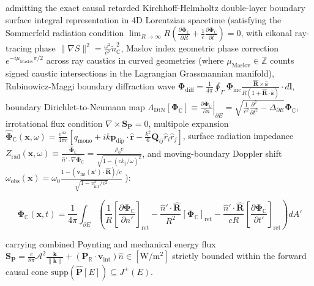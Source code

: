 \documentclass[11pt,a4paper]{article}
\theoremstyle{definition}
\theoremstyle{remark}
\begin{document}
admitting the exact causal retarded Kirchhoff-Helmholtz double-layer boundary surface integral representation in 4D Lorentzian spacetime (satisfying the Sommerfeld radiation condition $\lim_{R \to \infty} R \left( \frac{\partial \mathbf{\Phi}_{\mathbb{C}}}{\partial R} + \frac{1}{c} \frac{\partial \mathbf{\Phi}_{\mathbb{C}}}{\partial t} \right) = 0$, with eikonal ray-tracing phase $\|\nabla S\|^2 = \frac{\omega^2}{c^2}\tilde{n}_{\mathbb{C}}^2$, Maslov index geometric phase correction $e^{-i \mu_{\text{Maslov}}\pi/2}$ across ray caustics in curved geometries (where $\mu_{\text{Maslov}} \in \mathbb{Z}$ counts signed caustic intersections in the Lagrangian Grassmannian manifold), Rubinowicz-Maggi boundary diffraction wave $\mathbf{\Phi}_{\text{diff}} = \frac{1}{4\pi}\oint_{\Gamma} \mathbf{\Phi}_{\text{inc}}\frac{\hat{\mathbf{R}}\times\hat{\mathbf{s}}}{R(1+\hat{\mathbf{R}}\cdot\hat{\mathbf{s}})}\cdot d\mathbf{l}$, boundary Dirichlet-to-Neumann map $\Lambda_{\text{DtN}}[\mathbf{\Phi}_{\mathbb{C}}] \equiv \left. \frac{\partial\mathbf{\Phi}_{\mathbb{C}}}{\partial n} \right|_{\partial E} = \sqrt{\frac{1}{c^2}\frac{\partial^2}{\partial t^2} - \Delta_{\partial E}}\mathbf{\Phi}_{\mathbb{C}}$, irrotational flux condition $\nabla \times \mathbf{S}_{\mathbf{P}} = 0$, multipole expansion $\hat{\mathbf{\Phi}}_{\mathbb{C}}(\mathbf{x}, \omega) = \frac{e^{ikr}}{4\pi r}[q_{\text{mono}} + ik\mathbf{p}_{\text{dip}}\cdot\hat{\mathbf{r}} - \frac{k^2}{6}\mathbf{Q}_{ij}\hat{r}_i\hat{r}_j]$, surface radiation impedance $Z_{\text{rad}}(\mathbf{x}, \omega) \equiv \frac{\hat{\mathbf{\Phi}}_{\mathbb{C}}}{\hat{n}'\cdot\nabla\hat{\mathbf{\Phi}}_{\mathbb{C}}} = \frac{\rho_0 c}{\sqrt{1 - (c k_\parallel/\omega)^2}}$, and moving-boundary Doppler shift $\omega_{\text{obs}}(\mathbf{x}) = \omega_0 \frac{1 - (\mathbf{v}_{\text{int}}(\mathbf{x}')\cdot\hat{\mathbf{R}})/c}{\sqrt{1 - v_{\text{int}}^2/c^2}}$ ):


\begin{equation}
\mathbf{\Phi}_{\mathbb{C}}(\mathbf{x}, t) = \frac{1}{4\pi}\int_{\partial E} \left( \frac{1}{R}[ \frac{\partial\mathbf{\Phi}_{\mathbb{C}}}{\partial n'} ]_{\text{ret}} - \frac{\hat{n}' \cdot \hat{\mathbf{R}}}{R^2}[\mathbf{\Phi}_{\mathbb{C}}]_{\text{ret}} - \frac{\hat{n}' \cdot \hat{\mathbf{R}}}{c R}[\frac{\partial\mathbf{\Phi}_{\mathbb{C}}}{\partial t'}]_{\text{ret}} \right) dA'
\end{equation}


carrying combined Poynting and mechanical energy flux $\mathbf{S}_{\mathbf{P}} = \frac{c}{8\pi} \mathcal{A}^2 \frac{\mathbf{k}}{\|\mathbf{k}\|} + (\mathbf{P}_{\mathbb{R}} \cdot \mathbf{v}_{\text{int}})\hat{n} \in [\mathrm{W/m^2}]$ strictly bounded within the forward causal cone $\mathrm{supp}(\hat{\mathbf{P}}[E]) \subseteq J^+(E)$.
\end{document}
